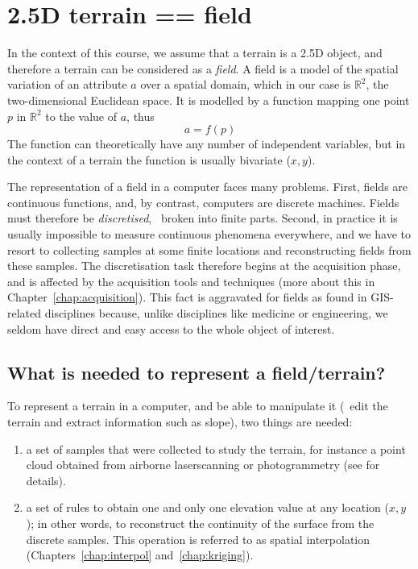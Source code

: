 %
\section{2.5D terrain == field}

In the context of this course, we assume that a terrain is a 2.5D object, and therefore a terrain can be considered as a \emph{field}.%
A field is a model of the spatial variation of an attribute $a$ over a spatial domain, which in our case is $\mathbb{R}^2$, the two-dimensional Euclidean space.%
It is modelled by a function mapping one point $p$ in $\mathbb{R}^2$ to the value of $a$, thus 
\[
  a = f(p)
\]
The function can theoretically have any number of independent variables, but in the context of a terrain the function is usually bivariate ($x,y$).

%

The representation of a field in a computer faces many problems. 
First, fields are continuous functions, and, by contrast, computers are discrete machines. 
Fields must therefore be \emph{discretised}, \ie\ broken into finite parts.%
Second, in practice it is usually impossible to measure continuous phenomena everywhere, and we have to resort to collecting samples at some finite locations and reconstructing fields from these samples.
The discretisation task therefore begins at the acquisition phase, and is affected by the acquisition tools and techniques (more about this in Chapter~\ref{chap:acquisition}).
This fact is aggravated for fields as found in GIS-related disciplines because, unlike disciplines like medicine or engineering, we seldom have direct and easy access to the whole object of interest.


\subsection{What is needed to represent a field/terrain?}

To represent a terrain in a computer, and be able to manipulate it (\ie\ edit the terrain and extract information such as slope), two things are needed:
\begin{enumerate}
  \item a set of samples that were collected to study the terrain, for instance a point cloud obtained from airborne laserscanning or photogrammetry (see  for details).
  \item a set of rules to obtain one and only one elevation value at any location ($x,y$); in other words, to reconstruct the continuity of the surface from the discrete samples.
  This operation is referred to as spatial interpolation (Chapters~\ref{chap:interpol} and~\ref{chap:kriging}). 
\end{enumerate}


